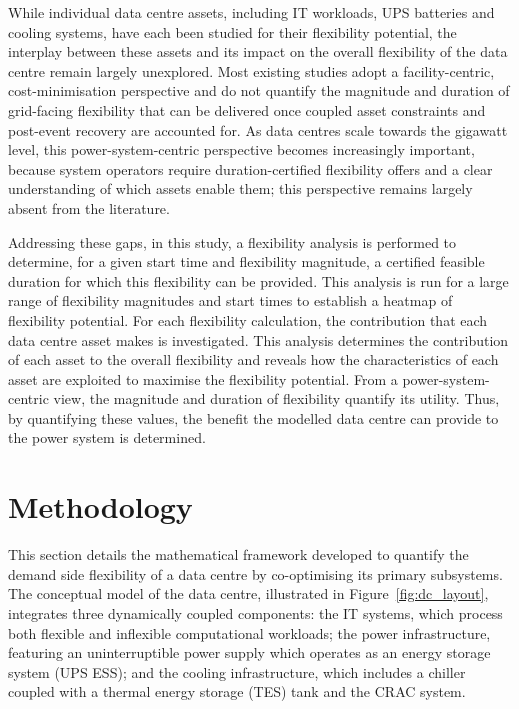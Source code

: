 \documentclass[lettersize,journal]{IEEEtran}
\newcommand{\rev}[1]{#1}
\begin{document}
\rev{While individual data centre assets, including IT workloads, UPS batteries and cooling systems, have each been studied for their flexibility potential, the interplay between these assets and its impact on the overall flexibility of the data centre remain largely unexplored. Most existing studies adopt a facility-centric, cost-minimisation perspective and do not quantify the magnitude and duration of grid-facing flexibility that can be delivered once coupled asset constraints and post-event recovery are accounted for. As data centres scale towards the gigawatt level, this power-system-centric perspective becomes increasingly important, because system operators require duration-certified flexibility offers and a clear understanding of which assets enable them; this perspective remains largely absent from the literature.}

Addressing these gaps, in this study, a flexibility analysis is performed to determine, for a given start time and flexibility magnitude, a certified feasible duration for which this flexibility can be provided. This analysis is run for a large range of flexibility magnitudes and start times to establish a heatmap of flexibility potential. For each flexibility calculation, the contribution that each data centre asset makes is investigated. This analysis determines the contribution of each asset to the overall flexibility and reveals how the characteristics of each asset are exploited to maximise the flexibility potential. From a power-system-centric view, the magnitude and duration of flexibility quantify its utility. Thus, by quantifying these values, the benefit the modelled data centre can provide to the power system is determined. 

\section{Methodology}
This section details the mathematical framework developed to quantify the demand side flexibility of a data centre by co-optimising its primary subsystems. The conceptual model of the data centre, illustrated in Figure~\ref{fig:dc_layout}, integrates three dynamically coupled components: the IT systems, which process both flexible and inflexible computational workloads; the power infrastructure, featuring an uninterruptible power supply which operates as an energy storage system (UPS ESS); and the cooling infrastructure, which includes a chiller coupled with a thermal energy storage (TES) tank and the CRAC system. 
\end{document}
